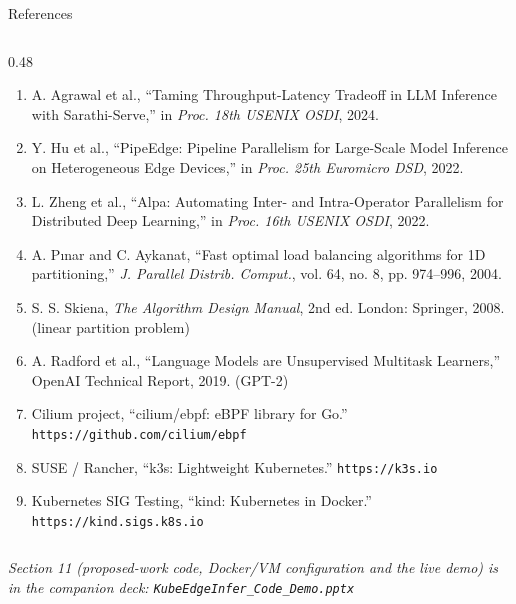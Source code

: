 \documentclass[aspectratio=169,9pt]{beamer}
\begin{document}
\begin{frame}[shrink=25]{References}
\begin{columns}[T]
\begin{column}{0.48\textwidth}
\begin{enumerate}
    \item A. Agrawal et al., ``Taming Throughput-Latency Tradeoff in LLM
      Inference with Sarathi-Serve,'' in \emph{Proc. 18th USENIX OSDI}, 2024.
    \item Y. Hu et al., ``PipeEdge: Pipeline Parallelism for Large-Scale Model
      Inference on Heterogeneous Edge Devices,'' in \emph{Proc. 25th Euromicro
      DSD}, 2022.
    \item L. Zheng et al., ``Alpa: Automating Inter- and Intra-Operator
      Parallelism for Distributed Deep Learning,'' in \emph{Proc. 16th USENIX
      OSDI}, 2022.
    \item A. P{\i}nar and C. Aykanat, ``Fast optimal load balancing algorithms
      for 1D partitioning,'' \emph{J. Parallel Distrib. Comput.}, vol. 64,
      no. 8, pp. 974--996, 2004.
    \item S. S. Skiena, \emph{The Algorithm Design Manual}, 2nd ed. London:
      Springer, 2008. (linear partition problem)
    \item A. Radford et al., ``Language Models are Unsupervised Multitask
      Learners,'' OpenAI Technical Report, 2019. (GPT-2)
    \item Cilium project, ``cilium/ebpf: eBPF library for Go.''
      \texttt{https://github.com/cilium/ebpf}
    \item SUSE / Rancher, ``k3s: Lightweight Kubernetes.''
      \texttt{https://k3s.io}
    \item Kubernetes SIG Testing, ``kind: Kubernetes in Docker.''
      \texttt{https://kind.sigs.k8s.io}
  \end{enumerate}
    \end{column}
  \end{columns}
  \vspace{0.5em}
  {\scriptsize\color{keMuted}\itshape Section 11 (proposed-work code, Docker/VM
  configuration and the live demo) is in the companion deck:
  \texttt{KubeEdgeInfer\_Code\_Demo.pptx}}
\end{frame}
\end{document}
